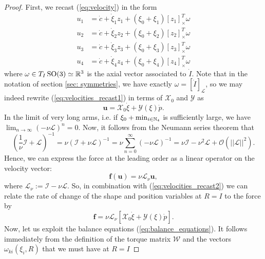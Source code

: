 \begin{proof}
First, we recast (\ref{eq:velocity}) in the form
\begin{equation}
\label{eq:velocities_recast1}
\begin{array}{lr}
	u_1 &= \dot{c} + \dot{\xi}_1 z_1 + (\xi_0 + \xi_1) [z_1]^T_{\times} \omega\\
	u_2 &= \dot{c} + \dot{\xi}_2 z_2 + (\xi_0 + \xi_2) [z_2]^T_{\times} \omega\\
	u_3 &= \dot{c} + \dot{\xi}_3 z_3 + (\xi_0 + \xi_3) [z_3]^T_{\times} \omega\\
	u_4 &= \dot{c} + \dot{\xi}_4 z_4 + (\xi_0 + \xi_4) [z_4]^T_{\times} \omega
\end{array}
\end{equation}
where $\omega \in T_{I}\operatorname{SO}(3) \simeq \mathbb{R}^3$ is the axial vector associated to $\dot{I}$. Note that in the notation of section \ref{sec: symmetries}, we have exactly $\omega = [\dot{I}]_{\mathcal{L}}$, so we may indeed rewrite (\ref{eq:velocities_recast1}) in terms of $\mathcal{X}_0$ and $\mathcal{Y}$ as
\begin{equation}
\label{eq:velocities_recast2}
	\mathbf{u} = \mathcal{X}_0 \dot{\xi} + \mathcal{Y}(\xi)\dot{p}.
\end{equation}
In the limit of very long arms, i.e. if $\xi_0 + \min_{i \in \mathbb{N}_4}$ is sufficiently large, we have $\lim_{n \to \infty}(- \nu \mathcal{L})^{n} = 0$. Now, it follows from the Neumann series theorem that
\begin{equation}
	(\frac{1}{\nu} \mathcal{I} + \mathcal{L})^{-1} = \nu(\mathcal{I} + \nu \mathcal{L})^{-1} = \nu \sum_{n = 0}^{\infty}(- \nu \mathcal{L})^{-1} = \nu \mathcal{I} - \nu^2 \mathcal{L} + \mathcal{O}(||\mathcal{L}||^2).
\end{equation}
Hence, we can express the force at the leading order as a linear operator on the velocity vector:
\begin{equation}
	\boldsymbol f(\mathbf{u}) = \nu \mathcal{L}_\nu \mathbf{u},
\end{equation}
where $\mathcal{L}_{\nu} := \mathcal{I} - \nu \mathcal{L}$. So, in combination with (\ref{eq:velocities_recast2}) we can relate the rate of change of the shape and position variables at $R = I$ to the force by
\begin{equation}
\label{eq:force_to_shape_and_position}
\boldsymbol f = \nu \mathcal{L}_{\nu}[\mathcal{X}_0 \dot{\xi} + \mathcal{Y}(\xi) \dot{p}].
\end{equation}
Now, let us exploit the balance equations (\ref{eq:balance_equations}). It follows immediately from the definition of the torque matrix $\mathcal{W}$ and the vectors $\omega_{ki}(\xi_i, R)$ that we must have at $R = I$

\end{proof}
